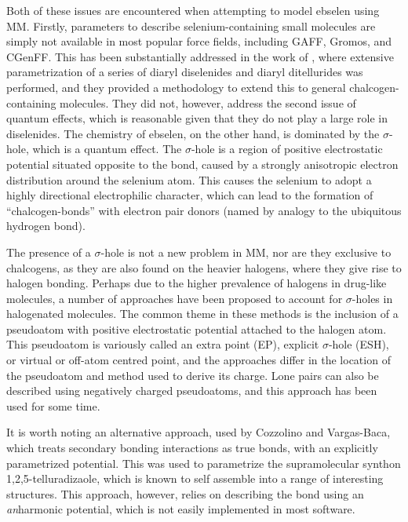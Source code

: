 \begin{refsection}
Both of these issues are encountered when attempting to model ebselen using MM.\@
Firstly, parameters to describe selenium-containing small molecules are simply not available in most popular force fields, including GAFF, Gromos, and CGenFF.\@
This has been substantially addressed in the work of \citeauthor{Torsello2016}, where extensive parametrization of a series of diaryl diselenides and diaryl ditellurides was performed, and they provided a methodology to extend this to general chalcogen-containing molecules.\autocite{Torsello2016}
They did not, however, address the second issue of quantum effects, which is reasonable given that they do not play a large role in diselenides.
The chemistry of ebselen, on the other hand, is dominated by the $ \sigma $-hole, which is a quantum effect.\autocite{Thomas2015}
The $ \sigma $-hole is a region of positive electrostatic potential situated opposite to the  bond, caused by a strongly anisotropic electron distribution around the selenium atom.
This causes the selenium to adopt a highly directional electrophilic character, which can lead to the formation of ``chalcogen-bonds'' with electron pair donors (named by analogy to the ubiquitous hydrogen bond).\autocite{Murray2009}

The presence of a $ \sigma $-hole is not a new problem in MM, nor are they exclusive to chalcogens, as they are also found on the heavier halogens, where they give rise to halogen bonding.\autocite{Clark2007}
Perhaps due to the higher prevalence of halogens in drug-like molecules, a number of approaches have been proposed to account for $ \sigma $-holes in halogenated molecules.
The common theme in these methods is the inclusion of a pseudoatom with positive electrostatic potential attached to the halogen atom.
This pseudoatom is variously called an extra point (EP), explicit $ \sigma $-hole (ESH), or virtual or off-atom centred point, and the approaches differ in the location of the pseudoatom and method used to derive its charge.\autocite{Renidine2011,Ibrahim2011,Hobza2012,Harder2016}
Lone pairs can also be described using negatively charged pseudoatoms, and this approach has been used for some time.\autocite{Dixon1997,Cieplak2001,Harder2016}

It is worth noting an alternative approach, used by Cozzolino and Vargas-Baca, which treats secondary bonding interactions as true bonds, with an explicitly parametrized potential.\autocite{Cozzolino2011}
This was used to parametrize the supramolecular synthon 1,2,5-tellura\-dizaole, which is known to self assemble into a range of interesting structures.
This approach, however, relies on describing the bond using an \emph{an}harmonic potential, which is not easily implemented in most software.


\end{refsection}
